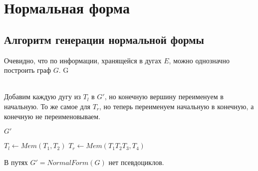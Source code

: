 \section{Нормальная форма}
\label{normal_gen_algo}

\subsection*{Алгоритм генерации нормальной формы}
\begin{algorithmic}[1]
        \State Очевидно, что по информации, хранящейся в дугах $E$, можно однозначно построить граф $G$.
        \State \Return G
    \EndFunction
    
    \\
        \State Добавим каждую дугу из $T_l$ в $G'$, но конечную вершину переименуем в начальную.
        \State То же самое для $T_r$, но теперь переименуем начальную в конечную, а конечную не переименовываем.

        \State \Return $G'$
    \EndFunction
    \\

                \State $T_l \gets Mem(T_1, T_2)$
                \State $T_r \gets Mem(T_1 T_2 T_3, T_4)$
                \EndIf
            \EndFor
        \EndFor

        \State {}
    \EndFunction
\end{algorithmic}

\begin{theorem}
    В путях $G' = NormalForm(G)$ нет псевдоциклов.
\end{theorem}

